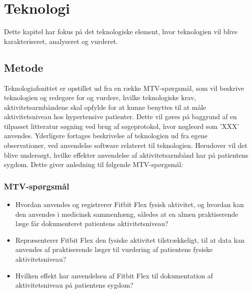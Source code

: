 \chapter{Teknologi}
Dette kapitel har fokus på det teknologiske element, hvor teknologien vil blive karakteriseret, analyseret og vurderet.
\section{Metode}
Teknologiafsnittet er opstillet ud fra en række MTV-spørgsmål, som vil beskrive teknologien og redegøre for og vurdere, hvilke teknologiske krav, aktivitetsarmbåndene skal opfylde for at kunne benyttes til at måle aktivitetsniveau hos hypertensive patienter. 
Dette vil gøres på baggrund af en tilpasset litteratur søgning ved brug af søgeprotokol, hvor nøgleord som 'XXX' anvendes. 
Yderligere fortages beskrivelse af teknologien ud fra egene observationer, ved anvendelse software relateret til teknologien.   
Herudover vil det blive undersøgt, hvilke effekter anvendelse af aktivitetsarmbånd har på patientens sygdom. 
Dette giver anledning til følgende MTV-spørgsmål: 
\subsection{MTV-spørgsmål}
\begin{itemize}
\item Hvordan anvendes og registrerer Fitbit Flex fysisk aktivitet, og hvordan kan den anvendes i medicinsk sammenhæng, således at en almen praktiserende læge får dokumenteret patientens aktivitetsniveau?
\item Repræsenterer Fitbit Flex den fysiske aktivitet tilstrækkeligt, til at data kan anvendes af praktiserende læger til vurdering af patientens fysiske aktivitetsniveau?
\item Hvilken effekt har anvendelsen af Fitbit Flex til dokumentation af aktivitetsniveau på patientens sygdom?
\end{itemize}








